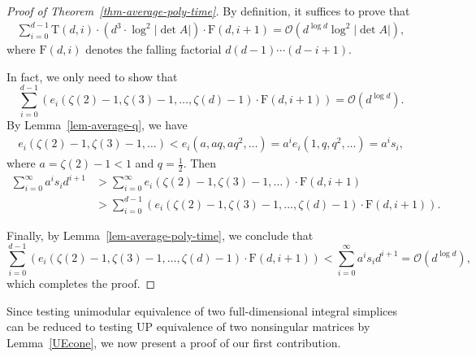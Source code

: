 \documentclass[reqno, 12pt]{article}
\theoremstyle{mydefinition}
\theoremstyle{myremark}
\numberwithin{algorithm}{section}
\begin{document}
\begin{proof}[Proof of Theorem~\ref{thm-average-poly-time}]
  By definition, it suffices to prove that
  \begin{align*}
    \sum_{i=0}^{d-1} \mathrm{T}(d,i) \cdot (d^3 \cdot \log^2  |\det A|) \cdot \mathrm F(d,i+1) = \mathcal{O}(d^{\log d} \log^2  |\det A|),
  \end{align*}
  where $\mathrm F(d,i)$ denotes the falling factorial $d(d-1)\dotsm(d-i+1)$.

  In fact, we only need to show that
  \[
     \sum_{i=0}^{d-1} \left(e_i(\zeta(2)-1,\zeta(3)-1,\dots,\zeta(d)-1) \cdot \mathrm F(d,i+1) \right)  = \mathcal{O}(d^{\log d}).
  \]
  By Lemma~\ref{lem-average-q}, we have
  \begin{align*}
     e_i(\zeta(2)-1,\zeta(3)-1,\ldots) <  e_i(a, aq ,aq^2, \dots) = a^i e_i(1, q , q^2,\dots)=a^i s_i,
  \end{align*}
  where $a = \zeta(2)-1 < 1$ and $q = \frac{1}{2}$. Then
  \begin{align*}
    \sum_{i=0}^{\infty} a^i s_i d^{i+1}
      & > \sum_{i=0}^{\infty} e_i(\zeta(2)-1,\zeta(3)-1,\ldots) \cdot \mathrm F(d,i+1) \\
      & > \sum_{i=0}^{d-1} \left(e_i(\zeta(2)-1,\zeta(3)-1,\dots,\zeta(d)-1) \cdot \mathrm F(d,i+1) \right).
  \end{align*}

  Finally, by Lemma~\ref{lem-average-poly-time}, we conclude that
  \[
    \sum_{i=0}^{d-1} \left(e_i(\zeta(2)-1,\zeta(3)-1,\dots,\zeta(d)-1) \cdot \mathrm F(d,i+1) \right) < \sum_{i=0}^{\infty} a^i s_i d^{i+1} = \mathcal{O}(d^{\log d}),
  \]
  which completes the proof.
\end{proof}



Since testing unimodular equivalence of two full-dimensional integral simplices can be reduced to testing UP equivalence of two nonsingular matrices by Lemma~\ref{UEcone}, we now present a proof of our first contribution.
\end{document}
